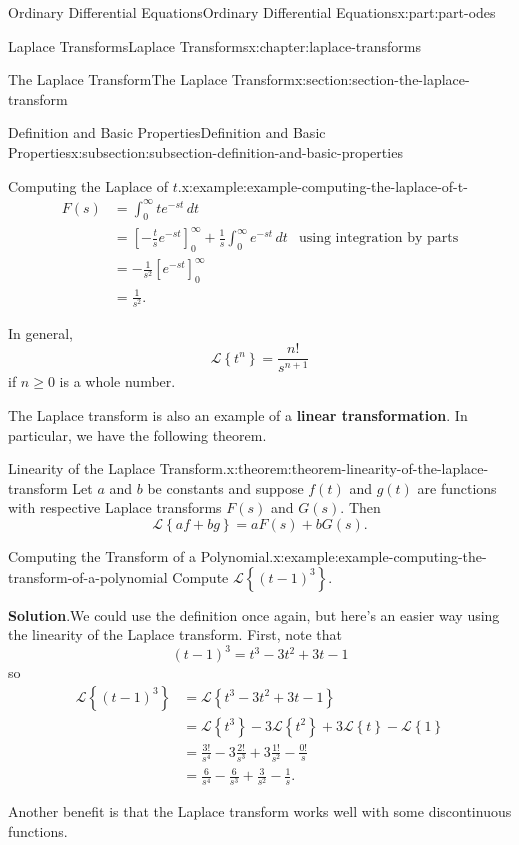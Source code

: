 \documentclass[twoside,10pt,]{book}
\newcommand{\blocktitlefont}{\relax}
\newcommand{\terminology}[1]{\textbf{#1}}
\numberwithin{equation}{part}
\newcommand{\Int}[2]{\int_{#1}^{#2}}
\newcommand{\Laplace}[1]{\mathcal{L}\left\{#1\right\}}
\newcommand{\amp}{&}
\begin{document}
\begin{partptx}{Ordinary Differential Equations}{}{Ordinary Differential Equations}{}{}{x:part:part-odes}
\begin{chapterptx}{Laplace Transforms}{}{Laplace Transforms}{}{}{x:chapter:laplace-transforms}
\begin{sectionptx}{The Laplace Transform}{}{The Laplace Transform}{}{}{x:section:section-the-laplace-transform}
\begin{subsectionptx}{Definition and Basic Properties}{}{Definition and Basic Properties}{}{}{x:subsection:subsection-definition-and-basic-properties}
\begin{example}{Computing the Laplace of \(t\).}{x:example:example-computing-the-laplace-of-t-}
\begin{align*}
F(s) \amp= \Int{0}{\infty}te^{-st}\,dt\\
\amp= \left[-\frac{t}{s}e^{-st}\right]_{0}^{\infty} + \frac{1}{s}\Int{0}{\infty}e^{-st}\,dt \amp\text{using integration by parts}\\
\amp= -\frac{1}{s^{2}}\left[e^{-st}\right]_{0}^{\infty}\\
\amp= \frac{1}{s^{2}}\text{.}
\end{align*}
%
\end{example}
In general,%
\begin{equation*}
\mathcal{L}\left\{t^{n}\right\} = \frac{n!}{s^{n+1}}
\end{equation*}
if \(n\geq0\) is a whole number.%
\par
The Laplace transform is also an example of a \terminology{linear transformation}. In particular, we have the following theorem.%
\begin{theorem}{Linearity of the Laplace Transform.}{}{x:theorem:theorem-linearity-of-the-laplace-transform}%
Let \(a\) and \(b\) be constants and suppose \(f(t)\) and \(g(t)\) are functions with respective Laplace transforms \(F(s)\) and \(G(s)\). Then%
\begin{equation*}
\Laplace{af+bg} = aF(s)+bG(s).
\end{equation*}
%
\end{theorem}
\begin{example}{Computing the Transform of a Polynomial.}{x:example:example-computing-the-transform-of-a-polynomial}%
Compute \(\Laplace{(t-1)^{3}}\).%
\par\smallskip%
\noindent\textbf{\blocktitlefont Solution}.\hypertarget{g:solution:idp105548816595872}{}\quad{}We could use the definition once again, but here's an easier way using the linearity of the Laplace transform. First, note that%
\begin{equation*}
(t-1)^{3} = t^{3} - 3t^{2} +3t - 1
\end{equation*}
so%
\begin{align*}
\Laplace{(t-1)^{3}} \amp= \Laplace{t^{3}-3t^{2}+3t-1}\\
\amp= \Laplace{t^{3}} - 3\Laplace{t^{2}} +3\Laplace{t} - \Laplace{1}\\
\amp= \frac{3!}{s^{4}} - 3\frac{2!}{s^{3}} + 3\frac{1!}{s^{2}} - \frac{0!}{s}\\
\amp= \frac{6}{s^{4}} - \frac{6}{s^{3}} + \frac{3}{s^{2}} - \frac{1}{s}\text{.}
\end{align*}
%
\end{example}
Another benefit is that the Laplace transform works well with some discontinuous functions.%

\end{subsectionptx}
\end{sectionptx}
\end{chapterptx}
\end{partptx}
\end{document}
